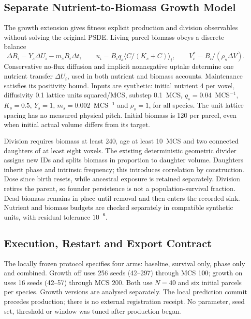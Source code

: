 \documentclass[11pt]{article}
\begin{document}
\subsection{Separate Nutrient-to-Biomass Growth Model}
\label{app:synthetic_growth}

The growth extension gives fitness explicit production and division observables without
solving the original PSDE. Living parcel biomass obeys a discrete balance
\begin{equation}
 \Delta B_i=Y_s\Delta U_i-m_s B_i\Delta t, \qquad
 u_i=B_iq_s\langle C/(K_s+C)\rangle_i,
 \qquad V_i^*=B_i/(\rho_s\Delta V).
\end{equation}
Conservative no-flux diffusion and implicit nonnegative uptake determine one nutrient
transfer $\Delta U_i$, used in both nutrient and biomass accounts. Maintenance satisfies
its positivity bound. Inputs are synthetic: initial nutrient 4 per voxel, diffusivity
0.1 lattice units squared/MCS, substep 0.1~MCS, $q_s=0.04$~MCS$^{-1}$, $K_s=0.5$,
$Y_s=1$, $m_s=0.002$~MCS$^{-1}$ and $\rho_s=1$, for all species. The unit lattice
spacing has no measured physical pitch. Initial biomass is 120 per parcel, even when
initial actual volume differs from its target.

Division requires biomass at least 240, age at least 10~MCS and two connected daughters
of at least eight voxels. The existing deterministic geometric divider assigns new IDs
and splits biomass in proportion to daughter volume. Daughters inherit phase and intrinsic
frequency; this introduces correlation by construction. Dose since birth resets, while
ancestral exposure is retained separately. Division retires the parent, so founder
persistence is not a population-survival fraction. Dead biomass remains in place until
removal and then enters the recorded sink. Nutrient and biomass budgets are checked
separately in compatible synthetic units, with residual tolerance $10^{-6}$.

\subsection{Execution, Restart and Export Contract}
\label{app:synthetic_execution}

The locally frozen protocol specifies four arms: baseline, survival only, phase only and
combined. Growth off uses 256 seeds (42--297) through MCS 100; growth on uses 16 seeds
(42--57) through MCS 200. Both use $N=40$ and six initial parcels per species.
Growth versions are analysed separately. The local prediction commit precedes production;
there is no external registration receipt. No parameter, seed set, threshold or window
was tuned after production began.
\end{document}
